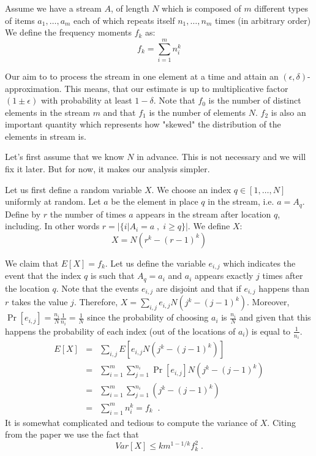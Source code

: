 \documentclass{article}
\begin{document}


Assume we have a stream $A$, of length $N$ which is composed of $m$ 
different types of items $a_1,\ldots,a_m$ each of which repeats itself $n_1,\ldots,n_m$ times (in arbitrary order)
We define the frequency moments $f_k$ as:
\[
f_k = \sum_{i=1}^{m} n_{i}^{k}
\]

Our aim to to process the stream in one element at a time and attain an $(\epsilon,\delta)$-approximation.
This means, that our estimate is up to multiplicative factor $(1\pm\epsilon)$ with probability at least $1-\delta$.  
Note that $f_0$ is the number of distinct elements in the stream $m$ and that $f_1$ is the number of elements $N$.
$f_2$ is also an important quantity which represents how "skewed" the distribution of the elements in stream is.


Let's first assume that we know $N$ in advance. This is not necessary and we will fix it later. But for now, it makes our
analysis simpler.

Let us first define a random variable $X$. We choose an index $q \in [1,\ldots,N]$ uniformly at random.
Let $a$ be the element in place $q$ in the stream, i.e. $a=A_q$. Define by $r$ the number of times $a$ appears in 
the stream after location $q$, including. In other words $r = |\{i | A_i = a \;,\; i\ge q\}|$.
We define $X$:
\[
X = N(r^k - (r-1)^k)
\]

We claim that $E[X] = f_k$. Let us define the variable $e_{i,j}$ which indicates the event that 
the index $q$ is such that $A_q = a_i$ and $a_i$ appears exactly $j$ times after the location $q$.
Note that the events $e_{i,j}$ are disjoint and that if $e_{i,j}$ happens than $r$ takes the value $j$. 
Therefore, $X = \sum_{i,j} e_{i,j}N(j^k - (j-1)^k)$. Moreover, $\Pr[e_{i,j}] = \frac{n_{i}}{N}\frac{1}{n_i} = \frac{1}{N}$     
since the probability of choosing $a_i$ is $\frac{n_i}{N}$ and given that this happens the probability of each index
(out of the locations of $a_i$) is equal to $\frac{1}{n_i}$.
\begin{eqnarray*}
E[X] &=& \sum_{i,j} E[e_{i,j}N(j^k - (j-1)^k)]\\
&=&\sum_{i=1}^{m}\sum_{j=1}^{n_i} \Pr[e_{i,j}]N(j^k - (j-1)^k)\\
&=&\sum_{i=1}^{m}\sum_{j=1}^{n_i} (j^k - (j-1)^k)\\
&=&\sum_{i=1}^{m} n_{i}^{k} = f_k \;\; . 
\end{eqnarray*}
It is somewhat complicated and tedious to compute the variance of $X$. Citing from the paper \cite{}
we use the fact that 
\[
Var[X] \le km^{1-1/k}f_{k}^{2} \; .
\] 
\end{document}
